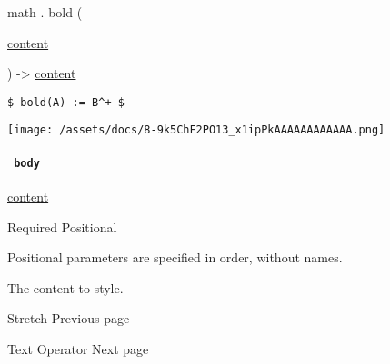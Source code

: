 math { . } { bold } (

{ \href{/docs/reference/foundations/content/}{content} }

) -\textgreater{} \href{/docs/reference/foundations/content/}{content}

\begin{verbatim}
$ bold(A) := B^+ $
\end{verbatim}

\texttt{[image: /assets/docs/8-9k5ChF2PO13\_x1ipPkAAAAAAAAAAAA.png]}

\paragraph{\texorpdfstring{\texttt{\ body\ }}{ body }}\label{functions-bold-body}

\href{/docs/reference/foundations/content/}{content}

{Required} {{ Positional }}

\label{functions-bold-body-positional-tooltip}
Positional parameters are specified in order, without names.

The content to style.

\href{/docs/reference/math/stretch/}{\pandocbounded{}}

{ Stretch } { Previous page }

\href{/docs/reference/math/op/}{\pandocbounded{}}

{ Text Operator } { Next page }
